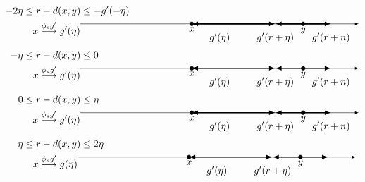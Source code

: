 \documentclass{article}
\begin{document}
\begin{align*}
-2\eta &\leq r - d(x,y) \leq -g'(-\eta) \\
&\quad x \overset{\phi_s g'}{\longrightarrow} g'(\eta) 
\begin{tikzpicture}[baseline=(current bounding box.center),>=latex]
    \draw[->] (-1,0) -- (9,0);
    \filldraw[black] (3,0) circle (2pt) node[below] {$x$};
    \filldraw[black] (7,0) circle (2pt) node[below] {$y$};
    \node at (4,-0.5) {$g'(\eta)$};
    \node at (6,-0.5) {$g'(r+\eta)$};
    \node at (8,-0.5) {$g'(r+n)$};
    \draw[<->,very thick] (3,0) -- (6,0);
    \draw[<->,very thick] (6,0) -- (8,0);
\end{tikzpicture} \\
-\eta &\leq r - d(x,y) \leq 0 \\
&\quad x \overset{\phi_s g'}{\longrightarrow} g'(\eta) 
\begin{tikzpicture}[baseline=(current bounding box.center),>=latex]
    \draw[->] (-1,0) -- (9,0);
    \filldraw[black] (3,0) circle (2pt) node[below] {$x$};
    \filldraw[black] (7,0) circle (2pt) node[below] {$y$};
    \node at (4,-0.5) {$g'(\eta)$};
    \node at (6,-0.5) {$g'(r+\eta)$};
    \node at (8,-0.5) {$g'(r+n)$};
    \draw[<->,very thick] (3,0) -- (6,0);
    \draw[<->,very thick] (6,0) -- (8,0);
\end{tikzpicture} \\
0 &\leq r - d(x,y) \leq \eta \\
&\quad x \overset{\phi_s g'}{\longrightarrow} g'(\eta) 
\begin{tikzpicture}[baseline=(current bounding box.center),>=latex]
    \draw[->] (-1,0) -- (9,0);
    \filldraw[black] (3,0) circle (2pt) node[below] {$x$};
    \filldraw[black] (7,0) circle (2pt) node[below] {$y$};
    \node at (4,-0.5) {$g'(\eta)$};
    \node at (6,-0.5) {$g'(r+\eta)$};
    \node at (8,-0.5) {$g'(r+n)$};
    \draw[<->,very thick] (3,0) -- (6,0);
    \draw[<->,very thick] (6,0) -- (8,0);
\end{tikzpicture} \\
\eta &\leq r - d(x,y) \leq 2\eta \\
&\quad x \overset{\phi_s g'}{\longrightarrow} g(\eta) 
\begin{tikzpicture}[baseline=(current bounding box.center),>=latex]
    \draw[->] (-1,0) -- (9,0);
    \filldraw[black] (3,0) circle (2pt) node[below] {$x$};
    \filldraw[black] (7,0) circle (2pt) node[below] {$y$};
    \node at (4,-0.5) {$g'(\eta)$};
    \node at (6,-0.5) {$g'(r+\eta)$};
    \draw[<->,very thick] (3,0) -- (6,0);
    \draw[<->,very thick] (6,0) -- (8,0);
\end{tikzpicture}
\end{align*}
\end{document}
